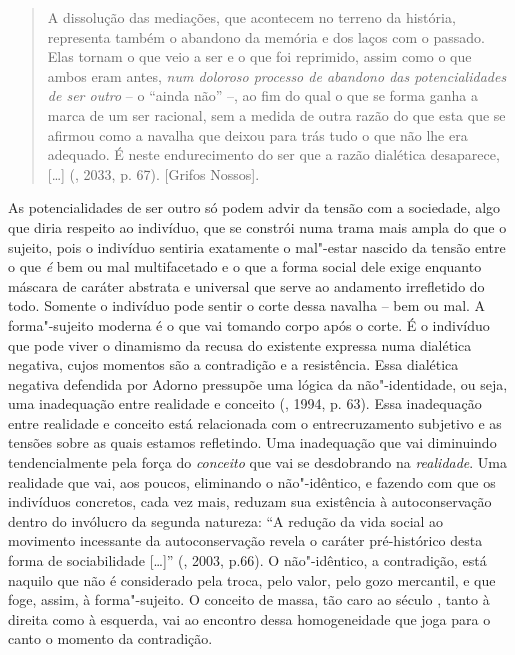 \begin{quote}
A dissolução das mediações, que acontecem no terreno da história,
representa também o abandono da memória e dos laços com o passado. Elas
tornam o que veio a ser e o que foi reprimido, assim como o que ambos
eram antes, \emph{num doloroso processo de abandono das potencialidades
de ser outro} -- o ``ainda não'' --, ao fim do qual o que se forma ganha
a marca de um ser racional, sem a medida de outra razão do que esta que
se afirmou como a navalha que deixou para trás tudo o que não lhe era
adequado. É neste endurecimento do ser que a razão dialética desaparece,
[\ldots{}] (, 2033, p. 67). [Grifos Nossos].
\end{quote}

As potencialidades de ser outro só podem advir da tensão com a
sociedade, algo que diria respeito ao indivíduo, que se constrói numa
trama mais ampla do que o sujeito, pois o indivíduo sentiria exatamente
o mal"-estar nascido da tensão entre o que \emph{é} bem ou mal
multifacetado e o que a forma social dele exige enquanto máscara de
caráter abstrata e universal que serve ao andamento irrefletido do todo.
Somente o indivíduo pode sentir o corte dessa navalha -- bem ou mal. A
forma"-sujeito moderna é o que vai tomando corpo após o corte. É o
indivíduo que pode viver o dinamismo da recusa do existente expressa
numa dialética negativa, cujos momentos são a contradição e a
resistência. Essa dialética negativa defendida por Adorno pressupõe uma
lógica da não"-identidade, ou seja, uma inadequação entre realidade e
conceito (, 1994, p. 63). Essa inadequação entre realidade e
conceito está relacionada com o entrecruzamento subjetivo e as tensões
sobre as quais estamos refletindo. Uma inadequação que vai diminuindo
tendencialmente pela força do \emph{conceito} que vai se desdobrando na
\emph{realidade}. Uma realidade que vai, aos poucos, eliminando o
não"-idêntico, e fazendo com que os indivíduos concretos, cada vez mais,
reduzam sua existência à autoconservação dentro do invólucro da segunda
natureza: ``A redução da vida social ao movimento incessante da
autoconservação revela o caráter pré-histórico desta forma de
sociabilidade [\ldots{}]'' (, 2003, p.66). O não"-idêntico, a
contradição, está naquilo que não é considerado pela troca, pelo valor,
pelo gozo mercantil, e que foge, assim, à forma"-sujeito. O conceito de
massa, tão caro ao século , tanto à direita como à esquerda, vai ao
encontro dessa homogeneidade que joga para o canto o momento da
contradição.

